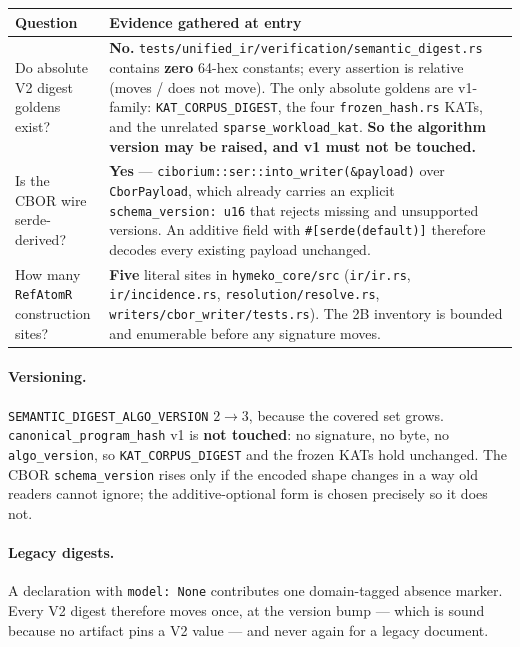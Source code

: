 \documentclass[11pt,a4paper]{article}
\begin{document}
\begin{center}\small
\begin{tabular}{@{}p{34mm}p{104mm}@{}}
\toprule
Question & Evidence gathered at entry \\
\midrule
Do absolute V2 digest goldens exist? & \textbf{No.} \texttt{tests/unified\_ir/verification/semantic\_digest.rs} contains \textbf{zero} 64-hex constants; every assertion is relative (moves / does not move). The only absolute goldens are v1-family: \texttt{KAT\_CORPUS\_DIGEST}, the four \texttt{frozen\_hash.rs} KATs, and the unrelated \texttt{sparse\_workload\_kat}. \textbf{So the algorithm version may be raised, and v1 must not be touched.} \\
Is the CBOR wire serde-derived? & \textbf{Yes} --- \texttt{ciborium::ser::into\_writer(\&payload)} over \texttt{CborPayload}, which already carries an explicit \texttt{schema\_version: u16} that rejects missing and unsupported versions. An additive field with \texttt{\#[serde(default)]} therefore decodes every existing payload unchanged. \\
How many \texttt{RefAtomR} construction sites? & \textbf{Five} literal sites in \texttt{hymeko\_core/src} (\texttt{ir/ir.rs}, \texttt{ir/incidence.rs}, \texttt{resolution/resolve.rs}, \texttt{writers/cbor\_writer/tests.rs}). The 2B inventory is bounded and enumerable before any signature moves. \\
\bottomrule
\end{tabular}
\end{center}

\paragraph{Versioning.} \texttt{SEMANTIC\_DIGEST\_ALGO\_VERSION} $2 \rightarrow 3$, because the
covered set grows. \texttt{canonical\_program\_hash} v1 is \textbf{not touched}: no signature, no
byte, no \texttt{algo\_version}, so \texttt{KAT\_CORPUS\_DIGEST} and the frozen KATs hold unchanged.
The CBOR \texttt{schema\_version} rises only if the encoded shape changes in a way old readers
cannot ignore; the additive-optional form is chosen precisely so it does not.

\paragraph{Legacy digests.} A declaration with \texttt{model: None} contributes one domain-tagged
absence marker. Every V2 digest therefore moves once, at the version bump --- which is sound because
no artifact pins a V2 value --- and never again for a legacy document.
\end{document}
